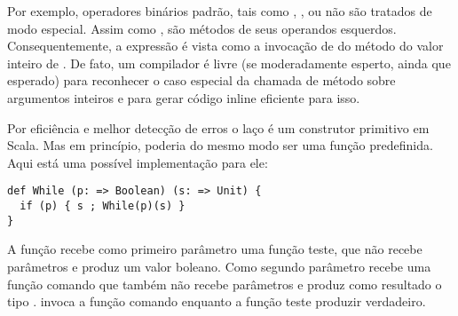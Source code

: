 Por exemplo, operadores bin\'{a}rios padr\~{a}o, tais como \code{+}, \code{-},
ou \code{<} n\~{a}o s\~{a}o tratados de modo especial. Assim como , 
s\~{a}o m\'{e}todos de seus operandos esquerdos. Consequentemente, a express\~{a}o 
 \'{e} vista como a invoca\c{c}\~{a}o de  do m\'{e}todo \code{+}      
do valor inteiro de . De fato, um compilador \'{e} livre (se 
moderadamente esperto, ainda que  esperado) para reconhecer o caso 
especial da chamada de m\'{e}todo \code{+} sobre argumentos inteiros e 
para gerar c\'{o}digo inline eficiente para isso.  

Por efici\^{e}ncia e melhor detec\c{c}\~{a}o de erros o la\c{c}o  \'{e} um construtor 
primitivo em Scala. Mas em princ\'{i}pio, poderia do mesmo modo ser uma fun\c{c}\~{a}o 
predefinida. Aqui est\'{a} uma poss\'{i}vel implementa\c{c}\~{a}o para ele: 
\begin{lstlisting}
def While (p: => Boolean) (s: => Unit) {
  if (p) { s ; While(p)(s) }
}
\end{lstlisting}

A fun\c{c}\~{a}o  recebe como primeiro par\^{a}metro uma fun\c{c}\~{a}o teste,
que n\~{a}o recebe par\^{a}metros e produz um valor boleano. Como segundo par\^{a}metro 
recebe uma fun\c{c}\~{a}o comando que tamb\'{e}m n\~{a}o recebe par\^{a}metros e produz como 
resultado o tipo  \lstinline@Unit@.  invoca a fun\c{c}\~{a}o comando
enquanto a fun\c{c}\~{a}o teste produzir verdadeiro.

